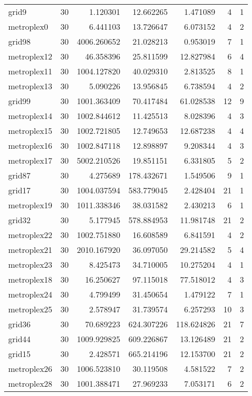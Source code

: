 \documentclass[../../../thesis.tex]{subfiles}
\begin{document}
\begin{longtable}{|l|r|r|r|r|r|r|}
grid9 & 30 & 1.120301 & 12.662265 & 1.471089 & 4 & 1 \\
metroplex0 & 30 & 6.441103 & 13.726647 & 6.073152 & 4 & 2 \\
grid98 & 30 & 4006.260652 & 21.028213 & 0.953019 & 7 & 1 \\
metroplex12 & 30 & 46.358396 & 25.811599 & 12.827984 & 6 & 4 \\
metroplex11 & 30 & 1004.127820 & 40.029310 & 2.813525 & 8 & 1 \\
metroplex13 & 30 & 5.090226 & 13.956845 & 6.738594 & 4 & 2 \\
grid99 & 30 & 1001.363409 & 70.417484 & 61.028538 & 12 & 9 \\
metroplex14 & 30 & 1002.844612 & 11.425513 & 8.028396 & 4 & 3 \\
metroplex15 & 30 & 1002.721805 & 12.749653 & 12.687238 & 4 & 4 \\
metroplex16 & 30 & 1002.847118 & 12.898897 & 9.208344 & 4 & 3 \\
metroplex17 & 30 & 5002.210526 & 19.851151 & 6.331805 & 5 & 2 \\
grid87 & 30 & 4.275689 & 178.432671 & 1.549506 & 9 & 1 \\
grid17 & 30 & 1004.037594 & 583.779045 & 2.428404 & 21 & 1 \\
metroplex19 & 30 & 1011.338346 & 38.031582 & 2.430213 & 6 & 1 \\
grid32 & 30 & 5.177945 & 578.884953 & 11.981748 & 21 & 2 \\
metroplex22 & 30 & 1002.751880 & 16.608589 & 6.841591 & 4 & 2 \\
metroplex21 & 30 & 2010.167920 & 36.097050 & 29.214582 & 5 & 4 \\
metroplex23 & 30 & 8.425473 & 34.710005 & 10.275204 & 4 & 1 \\
metroplex18 & 30 & 16.250627 & 97.115018 & 77.518012 & 4 & 3 \\
metroplex24 & 30 & 4.799499 & 31.450654 & 1.479122 & 7 & 1 \\
metroplex25 & 30 & 2.578947 & 31.739574 & 6.257293 & 10 & 3 \\
grid36 & 30 & 70.689223 & 624.307226 & 118.624826 & 21 & 7 \\
grid44 & 30 & 1009.929825 & 609.226867 & 13.126489 & 21 & 2 \\
grid15 & 30 & 2.428571 & 665.214196 & 12.153700 & 21 & 2 \\
metroplex26 & 30 & 1006.523810 & 30.119508 & 4.581522 & 7 & 2 \\
metroplex28 & 30 & 1001.388471 & 27.969233 & 7.053171 & 6 & 2 \\

\end{longtable}
\end{document}
